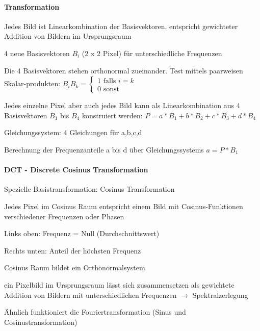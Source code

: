 \documentclass[landscape]{article}
\begin{document}
\begin{multicols}{3}
  \paragraph{Transformation}
  \begin{itemize*}
    \item Jedes Bild ist Linearkombination der Basisvektoren, entspricht gewichteter Addition von Bildern im Ursprungsraum
    \item 4 neue Basisvektoren $B_i$ (2 x 2 Pixel) für unterschiedliche Frequenzen
    \item Die 4 Basisvektoren stehen orthonormal zueinander. Test mittels paarweisen Skalar-produkten: $B_iB_k=\begin{cases}1 \text{ falls } i=k\\ 0 \text{ sonst }\end{cases}$
    \item Jedes einzelne Pixel aber auch jedes Bild kann als Linearkombination aus 4 Basisvektoren $B_1$ bis $B_4$ konstruiert werden: $P=a*B_1+b*B_2+c*B_3+d*B_4$
    \begin{itemize*}
      \item Gleichungssystem: 4 Gleichungen für a,b,c,d
      \item Berechnung der Frequenzanteile a bis d über Gleichungssystems $a=P*B_1$
    \end{itemize*}
  \end{itemize*}
  
  \paragraph{DCT - Discrete Cosinus Transformation}
  \begin{itemize*}
    \item Spezielle Basistransformation: Cosinus Transformation
    \item Jedes Pixel im Cosinus Raum entspricht einem Bild mit Cosinus-Funktionen verschiedener Frequenzen oder Phasen
    \begin{itemize*}
      \item Links oben: Frequenz = Null (Durchschnittswert)
      \item Rechts unten: Anteil der höchsten Frequenz
    \end{itemize*}
    \item Cosinus Raum bildet ein Orthonormalsystem
    \item ein Pixelbild im Ursprungsraum lässt sich zusammensetzen als gewichtete Addition von Bildern mit unterschiedlichen Frequenzen $\rightarrow$ Spektralzerlegung
    \item Ähnlich funktioniert die Fouriertransformation (Sinus und Cosinustransformation)
  \end{itemize*}
  

\end{multicols}
\end{document}
